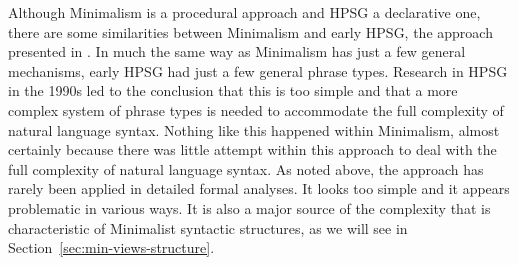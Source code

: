 \documentclass[output=paper
 	        ,biblatex
                ,babelshorthands
                ,newtxmath
                ,draftmode
                ,colorlinks, citecolor=brown
]{langscibook}
\begin{document}
Although Minimalism is a procedural approach and HPSG a declarative one, there are some
similarities between Minimalism and early HPSG, the approach presented in \citet{ps,ps2}. In much
the same way as Minimalism has just a few general mechanisms, early HPSG had just a few general
phrase types. Research in HPSG in the 1990s led to the conclusion that this is too simple and that a
more complex system of phrase types is needed to accommodate the full complexity of natural language
syntax. Nothing like this happened within Minimalism, almost certainly because there was little
attempt within this approach to deal with the full complexity of natural language syntax. As noted
above, the approach has rarely been applied in detailed formal analyses. It looks too simple and it
appears problematic in various ways. It is also a major source of the complexity that is
characteristic of Minimalist syntactic structures, as we will see in Section~\ref{sec:min-views-structure}. 

\end{document}
